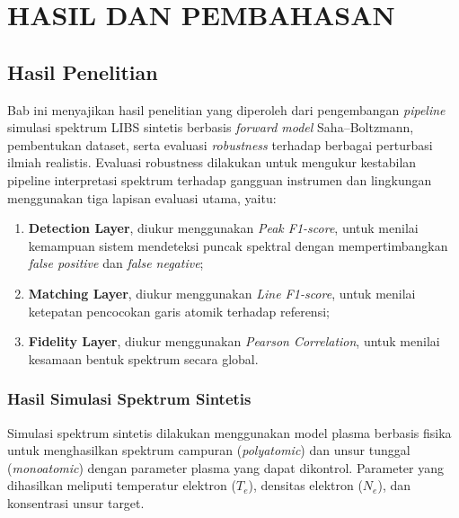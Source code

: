 
\chapter{HASIL DAN PEMBAHASAN}

\section{Hasil Penelitian}

Bab ini menyajikan hasil penelitian yang diperoleh dari pengembangan \textit{pipeline} simulasi spektrum LIBS sintetis berbasis \textit{forward model} Saha--Boltzmann, pembentukan dataset, serta evaluasi \textit{robustness} terhadap berbagai perturbasi ilmiah realistis. Evaluasi robustness dilakukan untuk mengukur kestabilan pipeline interpretasi spektrum terhadap gangguan instrumen dan lingkungan menggunakan tiga lapisan evaluasi utama, yaitu:

\begin{enumerate}
    \item \textbf{Detection Layer}, diukur menggunakan \textit{Peak F1-score}, untuk menilai kemampuan sistem mendeteksi puncak spektral dengan mempertimbangkan \textit{false positive} dan \textit{false negative};
    \item \textbf{Matching Layer}, diukur menggunakan \textit{Line F1-score}, untuk menilai ketepatan pencocokan garis atomik terhadap referensi;
    \item \textbf{Fidelity Layer}, diukur menggunakan \textit{Pearson Correlation}, untuk menilai kesamaan bentuk spektrum secara global.
\end{enumerate}

\subsection{Hasil Simulasi Spektrum Sintetis}

Simulasi spektrum sintetis dilakukan menggunakan model plasma berbasis fisika untuk menghasilkan spektrum campuran (\textit{polyatomic}) dan unsur tunggal (\textit{monoatomic}) dengan parameter plasma yang dapat dikontrol. Parameter yang dihasilkan meliputi temperatur elektron ($T_e$), densitas elektron ($N_e$), dan konsentrasi unsur target.

